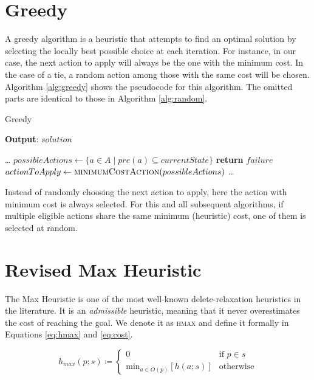 \section{Greedy}
A greedy algorithm is a heuristic that attempts to find an optimal solution by selecting the locally
best possible choice at each iteration. For instance, in our case, the next action to apply will
always be the one with the minimum cost. In the case of a tie, a random action among those with the same cost
will be chosen.
Algorithm \ref{alg:greedy} shows the pseudocode for this algorithm. The omitted parts are identical to those in Algorithm \ref{alg:random}.

\begin{algorithm}
	\caption{Greedy}
	\label{alg:greedy}
	\hspace*{0.5em} \textbf{Output}: $solution$
	\begin{algorithmic}[1]
		\State \dots
		\State $possibleActions \gets \{a \in A \mid pre(a) \subseteq currentState\}$
		\State \textbf{return} $failure$
		\EndIf
		\State $actionToApply \gets \Call{minimumCostAction}{possibleActions}$
		\State \dots
		\EndProcedure
	\end{algorithmic}
\end{algorithm}

Instead of randomly choosing the next action to apply, here the action with minimum cost is always selected.
For this and all subsequent algorithms, if multiple eligible actions share the same minimum (heuristic) cost,
one of them is selected at random.

\section{Revised Max Heuristic}
\label{sec:hmax}
The Max Heuristic is one of the most well-known delete-relaxation heuristics in the literature.
It is an \textit{admissible} heuristic, meaning that it never overestimates the cost of reaching the goal.
We denote it as \textsc{hmax} and define it formally in Equations \ref{eq:hmax} and \ref{eq:cost}.

\begin{equation}
	\label{eq:hmax}
	h_{max}\left(p;s\right) \coloneqq \begin{cases}
		0                                                                & \text{if $p \in s$} \\
		\text{min}_{a \in O\left(p\right)}\left[h\left(a;s\right)\right] & \text{otherwise}
	\end{cases}
\end{equation}

